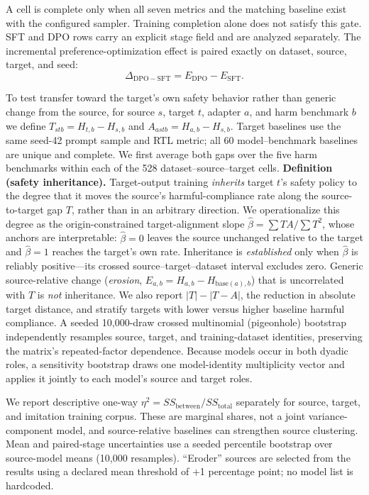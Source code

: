 \documentclass[letterpaper]{article}
\begin{document}
A cell is complete only when all seven metrics and the matching baseline exist with
the configured sampler. Training completion alone does not satisfy this gate. SFT and
DPO rows carry an explicit stage field and are analyzed separately. The incremental
preference-optimization effect is paired exactly on dataset, source, target, and seed:
\[
\Delta_{\mathrm{DPO-SFT}}=E_{\mathrm{DPO}}-E_{\mathrm{SFT}}.
\]

To test transfer toward the target's own safety behavior rather than generic change from
the source, for source $s$, target $t$, adapter $a$, and harm benchmark $b$ we define
$T_{stb}=H_{t,b}-H_{s,b}$ and $A_{astb}=H_{a,b}-H_{s,b}$. Target baselines use the same
seed-42 prompt sample and RTL metric; all 60 model--benchmark baselines are unique and
complete. We first average both gaps over the five harm benchmarks within each of the 528
dataset--source--target cells. \textbf{Definition (safety inheritance).} Target-output training \emph{inherits}
target $t$'s safety policy to the degree that it moves the source's harmful-compliance
rate along the source-to-target gap $T$, rather than in an arbitrary direction. We
operationalize this degree as the origin-constrained target-alignment slope
$\hat\beta=\sum T A/\sum T^2$, whose anchors are interpretable: $\hat\beta=0$ leaves the
source unchanged relative to the target and $\hat\beta=1$ reaches the target's own rate.
Inheritance is \emph{established} only when $\hat\beta$ is reliably positive---its crossed
source--target--dataset interval excludes zero. Generic source-relative change
(\emph{erosion}, $E_{a,b}=H_{a,b}-H_{\mathrm{base}(a),b}$) that is uncorrelated with $T$
is \emph{not} inheritance. We also report $|T|-|T-A|$, the reduction in absolute target distance, and
stratify targets with lower versus higher baseline harmful compliance. A seeded 10,000-draw
crossed multinomial (pigeonhole) bootstrap independently resamples source, target, and
training-dataset identities, preserving the matrix's repeated-factor dependence. Because
models occur in both dyadic roles, a sensitivity bootstrap draws one model-identity
multiplicity vector and applies it jointly to each model's source and target roles.

We report descriptive one-way $\eta^2=SS_{\mathrm{between}}/SS_{\mathrm{total}}$
separately for source, target, and imitation training corpus. These are marginal shares,
not a joint variance-component model, and source-relative baselines can strengthen
source clustering. Mean and paired-stage uncertainties use a seeded percentile bootstrap
over source-model means (10,000 resamples). ``Eroder'' sources are selected from the
results using a declared mean threshold of +1 percentage point; no model list is
hardcoded.
\end{document}
